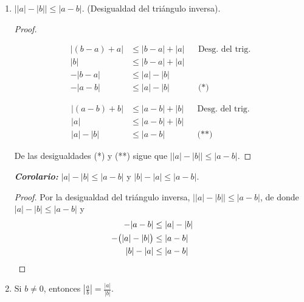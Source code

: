\documentclass[11pt]{article}
\newcommand{\bfit}[1]{\textbf{\textit{#1}}}
\begin{document}
\begin{enumerate}[label=\alph*)]
    \item $\big| |a|-|b| \big| \leq |a-b|$. (Desigualdad del triángulo inversa).

    \vspace{-1em}\begin{proof} \leavevmode
    \begin{center}\vspace{-2.5em}
    \begin{minipage}[t]{.5\linewidth}
    \begin{align*}
        |(b-a)+a| &\leq |b-a|+|a| && \text{Desg. del trig.} \\
        |b| &\leq |b-a|+|a| \\
        -|b-a| &\leq |a|-|b| \\
        -|a-b| &\leq |a|-|b| && \text{(*)}
    \end{align*}
    \end{minipage}%
    \begin{minipage}[t]{.5\linewidth}
    \begin{align*}
        |(a-b)+b| &\leq |a-b|+|b| && \text{Desg. del trig.} \\
        |a| &\leq |a-b|+|b| \\
        |a|-|b| &\leq |a-b| && \text{(**)}
    \end{align*}
    \end{minipage}
    \end{center}
    De las desigualdades (*) y (**) sigue que $\big| |a| - |b| \big| \leq |a-b|$.
    \end{proof} \vspace{-1em}

    \bfit{Corolario:} $|a|-|b|\leq |a-b|$ y $|b|-|a|\leq |a-b|$.
    \vspace{-1em}
    \begin{proof}
    Por la desigualdad del triángulo inversa, $\big| |a|-|b| \big| \leq |a-b|$, de donde $|a|-|b|\leq |a-b|$ y \begin{align*}
        -|a-b| &\leq |a|-|b|\\
        -\bigl(|a|-|b|\bigr) &\leq |a-b| \\
        |b|-|a| &\leq |a-b| && \qedhere
    \end{align*}
    \end{proof} \vspace{-1em}

\item Si $b\neq 0$, entonces $\left| \frac{a}{b} \right| = \frac{|a|}{|b|}$.


\end{enumerate}
\end{document}
